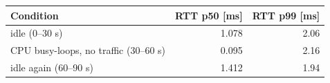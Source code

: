 \begin{tabular}{lrr}
\toprule
Condition & RTT p50 [ms] & RTT p99 [ms] \\
\midrule
idle (0–30 s) & 1.078 & 2.06 \\
CPU busy-loops, no traffic (30–60 s) & 0.095 & 2.16 \\
idle again (60–90 s) & 1.412 & 1.94 \\
\bottomrule
\end{tabular}

